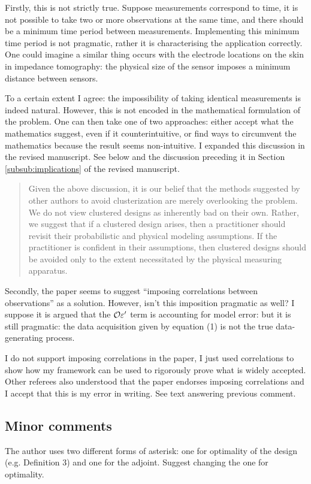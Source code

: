 \RC Firstly, this is not strictly true. Suppose measurements correspond to
time, it is not possible to take two or more observations at the same
time, and there should be a minimum time period between measurements.
Implementing this minimum time period is not pragmatic, rather it is
characterising the application correctly. One could imagine a similar
thing occurs with the electrode locations on the skin in impedance
tomography: the physical size of the sensor imposes a minimum
distance between sensors.

\AR To a certain extent I agree: the impossibility of taking identical
measurements is indeed natural. However, this is not encoded in the
mathematical formulation of the problem. One can then take one of two
approaches: either accept what the mathematics suggest, even if it
counterintuitive, or find ways to circumvent the mathematics because
the result seems non-intuitive. I expanded this discussion in the
revised manuscript. See below and the discussion preceding it in
Section \ref{subsub:implications} of the revised manuscript. 

\begin{quote}
  Given the above discussion, it is our belief that the methods
  suggested by other authors to avoid clusterization are merely
  overlooking the problem. We do not view clustered designs as
  inherently bad on their own. Rather, we suggest that if a clustered
  design arises, then a practitioner should revisit their probabilistic
  and physical modeling assumptions. If the practitioner is confident in
  their assumptions, then clustered designs should be avoided only to
  the extent necessitated by the physical measuring apparatus.
\end{quote}


\RC Secondly, the paper seems to suggest “imposing correlations
between observations” as a solution. However, isn’t this imposition
pragmatic as well? I suppose it is argued that the $\mathcal{O} \varepsilon'$ term
is accounting for model error: but it is still pragmatic: the data
acquisition given by equation (1) is not the true data-generating
process.

\AR I do not support imposing correlations in the paper, I just
used correlations to show how my framework can be used to rigorously
prove what is widely accepted. Other referees also understood that the
paper endorses imposing correlations and I accept that this is my
error in writing. See text answering previous comment.


\subsection{Minor comments}
\RC The author uses two different forms of asterisk: one for
optimality of the design (e.g. Definition 3) and one for the
adjoint. Suggest changing the one for optimality.

